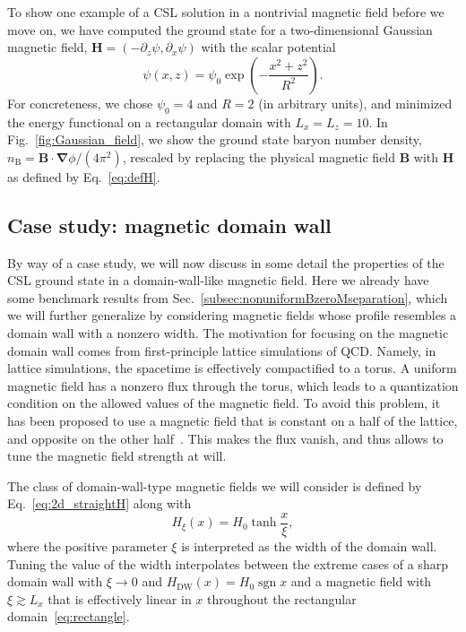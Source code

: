 \documentclass[pdflatex,iicol,sn-mathphys-num]{sn-jnl}
\let\p=\phi
\let\de=\partial
\newcommand{\vek}[1]{\bm{#1}}%
\newcommand{\grad}{\vek\nabla}%
\begin{document}
To show one example of a CSL solution in a nontrivial magnetic field before we move on, we have computed the ground state for a two-dimensional Gaussian magnetic field, $\vek{H}=(-\de_z\psi,\de_x\psi)$ with the scalar potential 
\begin{equation}
\psi(x,z)=\psi_0\exp\left(-\frac{x^2+z^2}{R^2}\right).
\label{eq:GaussH}
\end{equation}
For concreteness, we chose $\psi_0=4$ and $R=2$ (in arbitrary units), and minimized the energy functional on a rectangular domain with $L_x=L_z=10$. In Fig.~\ref{fig:Gaussian_field}, we show the ground state baryon number density, $n_\text{B}=\vek B\cdot\grad\p/(4\pi^2)$, rescaled by replacing the physical magnetic field $\vek B$ with $\vek H$ as defined by Eq.~\eqref{eq:defH}.


\subsection{Case study: magnetic domain wall}
\label{subsec:nonuniformBnonzeroMdomainwall}

By way of a case study, we will now discuss in some detail the properties of the CSL ground state in a domain-wall-like magnetic field. Here we already have some benchmark results from Sec.~\ref{subsec:nonuniformBzeroMseparation}, which we will further generalize by considering magnetic fields whose profile resembles a domain wall with a nonzero width. The motivation for focusing on the magnetic domain wall comes from first-principle lattice simulations of QCD. Namely, in lattice simulations, the spacetime is effectively compactified to a torus. A uniform magnetic field has a nonzero flux through the torus, which leads to a quantization condition on the allowed values of the magnetic field. To avoid this problem, it has been proposed to use a magnetic field that is constant on a half of the lattice, and opposite on the other half~\cite{Levkova2014}. This makes the flux vanish, and thus allows to tune the magnetic field strength at will. 

The class of domain-wall-type magnetic fields we will consider is defined by Eq.~\eqref{eq:2d_straightH} along with
\begin{equation}
H_\xi(x)=H_0\tanh\frac{x}{\xi},
\label{eq:tanhwall}
\end{equation}
where the positive parameter $\xi$ is interpreted as the width of the domain wall. Tuning the value of the width interpolates between the extreme cases of a sharp domain wall with $\xi\to0$ and $H_\text{DW}(x)=H_0\operatorname{sgn}x$ and a magnetic field with $\xi\gtrsim L_x$ that is effectively linear in $x$ throughout the rectangular domain~\eqref{eq:rectangle}.
\end{document}
